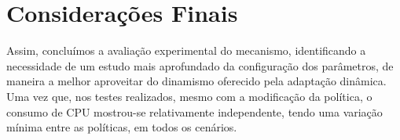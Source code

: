 \section{Considerações Finais}
Assim, concluímos a avaliação experimental do mecanismo, identificando a necessidade de um estudo mais aprofundado da configuração dos parâmetros, de maneira a melhor aproveitar do dinamismo oferecido pela adaptação dinâmica. Uma vez que, nos testes realizados, mesmo com a modificação da política, o consumo de CPU mostrou-se relativamente independente, tendo uma variação mínima entre as políticas, em todos os cenários.
